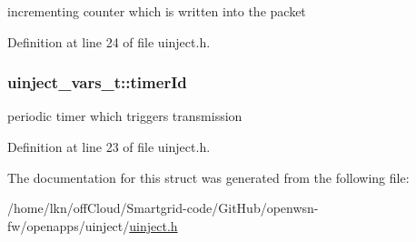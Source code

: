 incrementing counter which is written into the packet 



Definition at line 24 of file uinject.\+h.

\subsubsection[{\texorpdfstring{timer\+Id}{timerId}}]{ uinject\+\_\+vars\+\_\+t\+::timer\+Id}\hypertarget{structuinject__vars__t_a18a921b840a55a17d55c43086741b74a}{}\label{structuinject__vars__t_a18a921b840a55a17d55c43086741b74a}


periodic timer which triggers transmission 



Definition at line 23 of file uinject.\+h.



The documentation for this struct was generated from the following file\+:\begin{DoxyCompactItemize}
\item 
/home/lkn/off\+Cloud/\+Smartgrid-\/code/\+Git\+Hub/openwsn-\/fw/openapps/uinject/\hyperlink{uinject_8h}{uinject.\+h}\end{DoxyCompactItemize}

